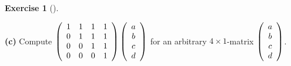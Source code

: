 \documentclass[numbers=enddot,12pt,final,onecolumn,notitlepage]{scrartcl}%
\theoremstyle{definition}
\newtheorem{exmp}[theo]{Exercise}
\newenvironment{exercise}[1][]
{\begin{exmp}[#1]\begin{leftbar}}
{\end{leftbar}\end{exmp}}
\begin{document}
\begin{exercise}
\textbf{(c)} Compute $\left(
\begin{array}
[c]{cccc}%
1 & 1 & 1 & 1\\
0 & 1 & 1 & 1\\
0 & 0 & 1 & 1\\
0 & 0 & 0 & 1
\end{array}
\right)  \left(
\begin{array}
[c]{c}%
a\\
b\\
c\\
d
\end{array}
\right)  $ for an arbitrary $4\times1$-matrix $\left(
\begin{array}
[c]{c}%
a\\
b\\
c\\
d
\end{array}
\right)  $.
\end{exercise}
\end{document}

